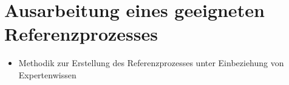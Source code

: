 \section{Ausarbeitung eines geeigneten Referenzprozesses}
\label{ch_05Ausarbeitung eines geeigneten Referenzprozesses}
\begin{itemize}
	\item Methodik zur Erstellung des Referenzprozesses unter Einbeziehung von Expertenwissen
\end{itemize}